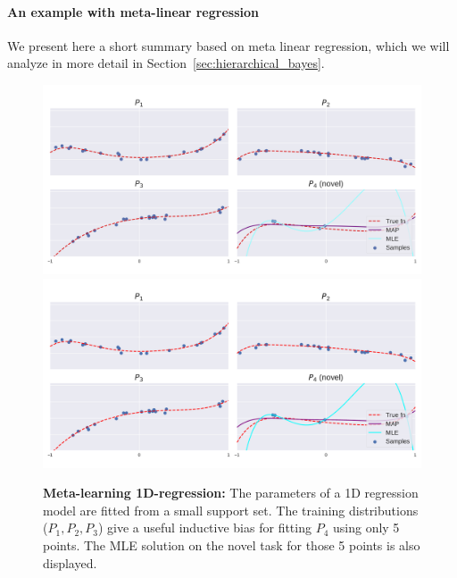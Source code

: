 \paragraph{An example with meta-linear regression}
We present here a short summary based on meta linear regression, which we will analyze
in more detail in Section~\ref{sec:hierarchical_bayes}.

\begin{figure}
\iflatexml
\includegraphics[width=6\linewidth]{main/images/meta_regression.png}%
\else
\centering
\includegraphics[width=\linewidth]{main/images/meta_regression.pdf}%
\fi
\caption{\textbf{Meta-learning 1D-regression:} The parameters of a 1D regression model are fitted
from a small support set. The training distributions ($P_1,P_2,P_3$) give a useful inductive bias
for fitting $P_4$ using only 5 points. The MLE solution on the novel task for those 5 points is also
displayed.}
\label{fig:meta_lin_ref}
\end{figure}
